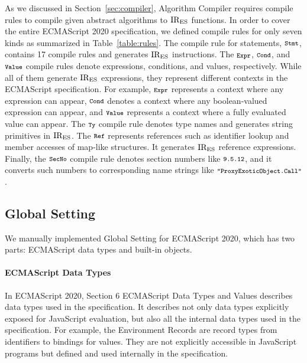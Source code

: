 As we discussed in Section~\ref{sec:compiler}, \textsf{Algorithm Compiler}
requires compile rules to compile given abstract algorithms to \( \text{IR}_\text{ES} \)
functions.  In order to cover the entire ECMAScript 2020 specification,
we defined compile rules for only seven kinds as summarized in
Table~\ref{table:rules}.  The compile rule for statements, \( \texttt{\footnotesize Stmt} \),
contains 17 compile rules and generates \( \text{IR}_\text{ES} \) instructions.
The \( \texttt{\footnotesize Expr} \), \( \texttt{\footnotesize Cond} \), and \( \texttt{\footnotesize Value} \) compile
rules denote expressions, conditions, and values, respectively.  While
all of them generate \( \text{IR}_\text{ES} \) expressions, they represent different
contexts in the ECMAScript specification.  For example,
\( \texttt{\footnotesize Expr} \) represents a context where any expression can appear,
\( \texttt{\footnotesize Cond} \) denotes a context where any boolean-valued expression
can appear, and \( \texttt{\footnotesize Value} \) represents a context where a fully
evaluated value can appear.  The \( \texttt{\footnotesize Ty} \) compile rule denotes
type names and generates string primitives in \( \text{IR}_\text{ES} \).  The \( \texttt{\footnotesize Ref} \)
represents references such as identifier lookup and member accesses of
map-like structures.  It generates \( \text{IR}_\text{ES} \) reference expressions.
Finally, the \( \texttt{\footnotesize SecNo} \) compile rule denotes section numbers
like \( \texttt{\footnotesize9.5.12} \), and it converts such numbers to
corresponding name strings like \( \texttt{\footnotesize"ProxyExoticObject.Call"} \).

\subsection{Global Setting}
We manually implemented \textsf{Global Setting} for ECMAScript 2020,
which has two parts: ECMAScript data types and built-in objects.

\vspace*{-.5em}
\paragraph{ECMAScript Data Types}
In ECMAScript 2020, Section 6 \textsf{ECMAScript Data Types and Values}
describes data types used in the specification.  It describes not only
data types explicitly exposed for JavaScript evaluation, but also all
the internal data types used in the specification.  For example, the
Environment Records are record types from identifiers to bindings for
values.  They are not explicitly accessible in JavaScript programs
but defined and used internally in the specification.

